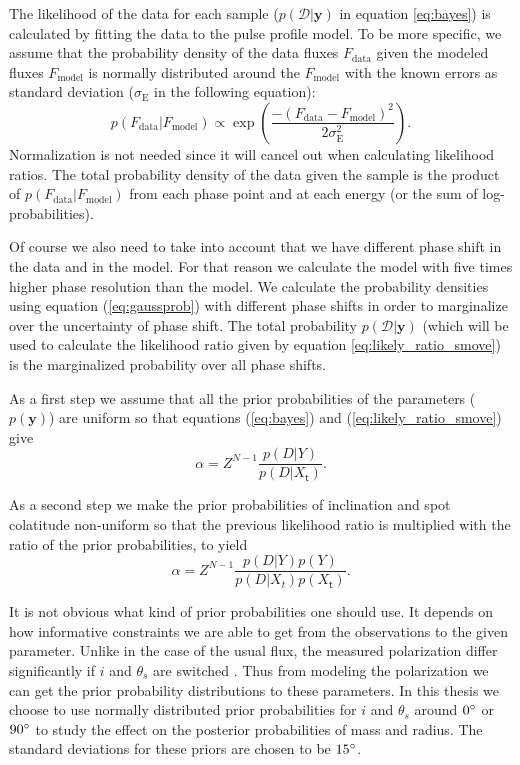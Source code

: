 \documentclass{wihuri}
\def\be{\begin{equation}}
\def\ee{\end{equation}}
\def\thetas{\theta_{s}}
\def\tstep{\mathsf{t}}
\begin{document}
The likelihood of the data for each sample ($p(\mathcal{D}|\textbf{y})$ in equation \ref{eq:bayes}) is calculated by fitting the data to the pulse profile model. To be more specific, we assume that the probability density of the data fluxes $F_{\mathrm{data}}$ given the modeled fluxes $F_{\mathrm{model}}$  is normally distributed around the $F_{\mathrm{model}}$ with the known errors as standard deviation ($\sigma_{\mathrm{E}}$ in the following equation): 
\be \label{eq:gaussprob}
p(F_{\mathrm{data}}|F_{\mathrm{model}}) \propto \exp \left (\frac{-(F_{\mathrm{data}}-F_{\mathrm{model}})^{2}}{2\sigma_{\mathrm{E}}^{2}} \right ).
\ee
Normalization is not needed since it will cancel out when calculating likelihood ratios. The total probability density of the data given the sample is the product of $p(F_{\mathrm{data}}|F_{\mathrm{model}})$ from each phase point and at each energy (or the sum of log-probabilities). 

Of course we also need to take into account that we have different phase shift in the data and in the model. For that reason we calculate the model with five times higher phase resolution than the model. We calculate the probability densities using equation (\ref{eq:gaussprob}) with different phase shifts in order to marginalize over the uncertainty of phase shift. %
The total probability $p(\mathcal{D}|\textbf{y})$ (which will be used to calculate the likelihood ratio given by equation \ref{eq:likely_ratio_smove}) is the marginalized probability over all phase shifts. 

As a first step we assume that all the prior probabilities of the parameters ($p(\textbf{y})$) are uniform so that equations (\ref{eq:bayes}) and (\ref{eq:likely_ratio_smove}) give 
\be \label{eq:alpha1}
\alpha = Z^{N-1}\frac{p(D|Y)}{p(D|X_{\tstep})}.
\ee

As a second step we make the prior probabilities of inclination and spot colatitude non-uniform so that the previous likelihood ratio is multiplied with the ratio of the prior probabilities, to yield
\be \label{eq:alpha2}
\alpha = Z^{N-1}\frac{p(D|Y)p(Y)}{p(D|X_{t})p(X_{\tstep})}.
\ee

It is not obvious what kind of prior probabilities one should use. It depends on how informative constraints we are able to get from the observations to the given parameter. Unlike in the case of the usual flux, the measured polarization differ significantly if $i$ and $\thetas$ are switched \cite{poutaviironen}. Thus from modeling the polarization we can get the prior probability distributions to these parameters. In this thesis we choose to use normally distributed prior probabilities for $i$ and $\thetas$ around $0 \degree$ or $90 \degree$ to study the effect on the posterior probabilities of mass and radius. The standard deviations for these priors are chosen to be $15 \degree$. 
\end{document}
